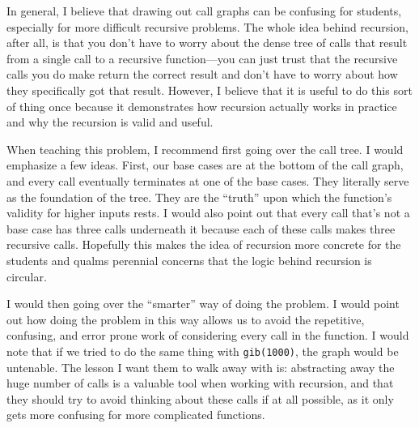 \begin{questionmeta}
In general, I believe that drawing out call graphs can be confusing for students, especially for more difficult recursive problems. The whole idea behind recursion, after all, is that you don't have to worry about the dense tree of calls that result from a single call to a recursive function---you can just trust that the recursive calls you do make return the correct result and don't have to worry about how they specifically got that result. However, I believe that it is useful to do this sort of thing once because it demonstrates how recursion actually works in practice and why the recursion is valid and useful.

When teaching this problem, I recommend first going over the call tree. I would emphasize a few ideas. First, our base cases are at the bottom of the call graph, and every call eventually terminates at one of the base cases. They literally serve as the foundation of the tree. They are the ``truth'' upon which the function's validity for higher inputs rests. I would also point out that every call that's not a base case has three calls underneath it because each of these calls makes three recursive calls. Hopefully this makes the idea of recursion more concrete for the students and qualms perennial concerns that the logic behind recursion is circular. 

I would then going over the ``smarter'' way of doing the problem. I would point out how doing the problem in this way allows us to avoid the repetitive, confusing, and error prone work of considering every call in the function. I would note that if we tried to do the same thing with \lstinline{gib(1000)}, the graph would be untenable. The lesson I want them to walk away with is: abstracting away the huge number of calls is a valuable tool when working with recursion, and that they should try to avoid thinking about these calls if at all possible, as it only gets more confusing for more complicated functions. 
\end{questionmeta}